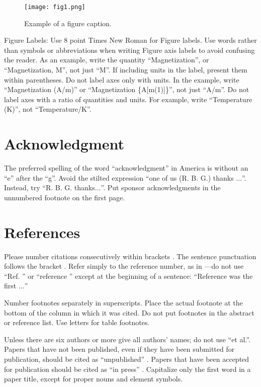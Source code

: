 \documentclass[conference]{IEEEtran}
\begin{document}
\begin{figure}[htbp]
\centerline{\texttt{[image: fig1.png]}}
\caption{Example of a figure caption.}
\label{fig}
\end{figure}

Figure Labels: Use 8 point Times New Roman for Figure labels. Use words 
rather than symbols or abbreviations when writing Figure axis labels to 
avoid confusing the reader. As an example, write the quantity 
``Magnetization'', or ``Magnetization, M'', not just ``M''. If including 
units in the label, present them within parentheses. Do not label axes only 
with units. In the example, write ``Magnetization (A/m)'' or ``Magnetization 
\{A[m(1)]\}'', not just ``A/m''. Do not label axes with a ratio of 
quantities and units. For example, write ``Temperature (K)'', not 
``Temperature/K''.

\section*{Acknowledgment}

The preferred spelling of the word ``acknowledgment'' in America is without 
an ``e'' after the ``g''. Avoid the stilted expression ``one of us (R. B. 
G.) thanks $\ldots$''. Instead, try ``R. B. G. thanks$\ldots$''. Put sponsor 
acknowledgments in the unnumbered footnote on the first page.

\section*{References}

Please number citations consecutively within brackets \cite{b1}. The 
sentence punctuation follows the bracket \cite{b2}. Refer simply to the reference 
number, as in \cite{b3}---do not use ``Ref. \cite{b3}'' or ``reference \cite{b3}'' except at 
the beginning of a sentence: ``Reference \cite{b3} was the first $\ldots$''

Number footnotes separately in superscripts. Place the actual footnote at 
the bottom of the column in which it was cited. Do not put footnotes in the 
abstract or reference list. Use letters for table footnotes.

Unless there are six authors or more give all authors' names; do not use 
``et al.''. Papers that have not been published, even if they have been 
submitted for publication, should be cited as ``unpublished'' \cite{b4}. Papers 
that have been accepted for publication should be cited as ``in press'' \cite{b5}. 
Capitalize only the first word in a paper title, except for proper nouns and 
element symbols.
\end{document}
